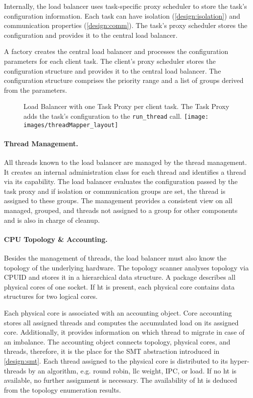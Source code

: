 Internally, the load balancer uses task-specific proxy scheduler to store the
task's configuration information.
Each task can have isolation (\ref{design:isolation}) and communication
properties (\ref{design:comm}).
The task's proxy scheduler stores the configuration and provides it to the
central load balancer.

A factory creates the central load balancer and processes the configuration
parameters for each client task.
The client's proxy scheduler stores the configuration structure and provides it
to the central load balancer.
The configuration structure comprises the priority range and a list of
groups derived from the parameters.

\begin{figure}[h!]
  \setcapindent*{1em}
  \begin{captionbeside}[]{Load Balancer with one Task Proxy per client task.
      The Task Proxy adds the task's configuration to the \texttt{run\_thread}
    call.}
  \texttt{[image: images/threadMapper\_layout]}
\end{captionbeside}
  \label{state:figbalancer_proxy}
\end{figure}


\paragraph{Thread Management.}
All threads known to the load balancer are managed by the thread management.
It creates an internal administration class for each thread and identifies a
thread via its capability.
The load balancer evaluates the configuration passed by the task proxy and
if isolation or communication groups are set, the thread is assigned to these
groups.
The management provides a consistent view on all managed, grouped, and threads
not assigned to a group for other components and is also in charge of cleanup.


\paragraph{CPU Topology \& Accounting.}
Besides the management of threads, the load balancer must also know the
topology of the underlying hardware.
The topology scanner analyses topology via CPUID and stores it in a
hierarchical data structure.
A package describes all physical cores of one socket.
If \gls{ht} is present, each physical core contains data structures for
two logical cores.

Each physical core is associated with an accounting object.
Core accounting stores all assigned threads and computes the accumulated
load on its assigned core.
Additionally, it provides information on which thread to migrate in case of an
imbalance.
The accounting object connects topology, physical cores, and threads, therefore,
it is the place for the SMT abstraction introduced in \ref{design:smt}.
Each thread assigned to the physical core is distributed to its hyper-threads
by an algorithm, e.g. round robin, \gls{llc} weight, IPC, or load.
If no \gls{ht} is available, no further assignment is necessary.
The availability of \gls{ht} is deduced from the topology enumeration results.



